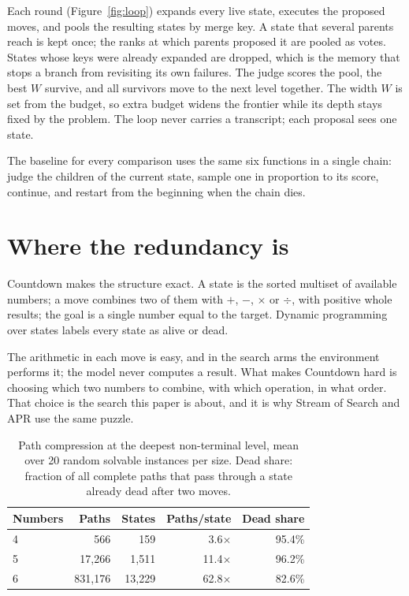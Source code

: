 \documentclass[10pt,twocolumn]{article}
\begin{document}
Each round (Figure~\ref{fig:loop}) expands every live state, executes the proposed moves, and pools the resulting states by merge key. A state that several parents reach is kept once; the ranks at which parents proposed it are pooled as votes. States whose keys were already expanded are dropped, which is the memory that stops a branch from revisiting its own failures. The judge scores the pool, the best $W$ survive, and all survivors move to the next level together. The width $W$ is set from the budget, so extra budget widens the frontier while its depth stays fixed by the problem. The loop never carries a transcript; each proposal sees one state.

The baseline for every comparison uses the same six functions in a single chain: judge the children of the current state, sample one in proportion to its score, continue, and restart from the beginning when the chain dies.

\section{Where the redundancy is}
\label{sec:redundancy}

Countdown makes the structure exact. A state is the sorted multiset of available numbers; a move combines two of them with $+$, $-$, $\times$ or $\div$, with positive whole results; the goal is a single number equal to the target. Dynamic programming over states labels every state as alive or dead.

The arithmetic in each move is easy, and in the search arms the environment performs it; the model never computes a result. What makes Countdown hard is choosing which two numbers to combine, with which operation, in what order. That choice is the search this paper is about, and it is why Stream of Search \citep{gandhi2024sos} and APR \citep{pan2025apr} use the same puzzle.

\begin{table}[t]
\centering\small
\begin{tabular}{lrrrr}
\toprule
Numbers & Paths & States & Paths/state & Dead share \\
\midrule
4 & 566 & 159 & 3.6$\times$ & 95.4\% \\
5 & 17,266 & 1,511 & 11.4$\times$ & 96.2\% \\
6 & 831,176 & 13,229 & 62.8$\times$ & 82.6\% \\
\bottomrule
\end{tabular}
\caption{Path compression at the deepest non-terminal level, mean over 20 random solvable instances per size. Dead share: fraction of all complete paths that pass through a state already dead after two moves.}
\label{tab:compression}
\end{table}
\end{document}
